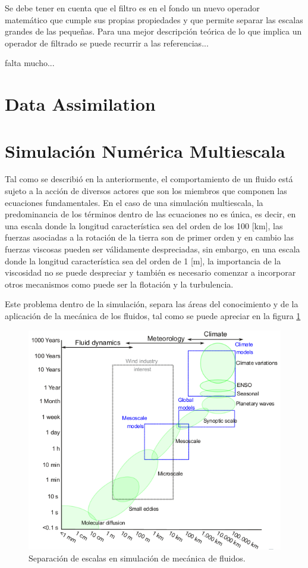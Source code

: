 Se debe tener en cuenta que el filtro es en el fondo un nuevo operador matemático que cumple sus propias propiedades y que permite separar las escalas grandes de las pequeñas. Para una mejor descripción teórica de lo que implica un operador de filtrado se puede recurrir a las referencias...

falta mucho...

\section{Data Assimilation}

\section{Simulación Numérica Multiescala}
Tal como se describió en la anteriormente, el comportamiento de un fluido está sujeto a la acción de diversos actores que son los miembros que componen las ecuaciones fundamentales. En el caso de una simulación multiescala, la predominancia de los términos dentro de las ecuaciones no es única, es decir, en una escala donde la longitud característica sea del orden de los 100 [km], las fuerzas asociadas a la rotación de la tierra son de primer orden y en cambio las fuerzas viscosas pueden ser válidamente despreciadas, sin embargo, en una escala donde la longitud característica sea del orden de 1 [m], la importancia de la viscosidad no se puede despreciar y también es necesario comenzar a incorporar otros mecanismos como puede ser la flotación y la turbulencia.

Este problema dentro de la simulación, separa las áreas del conocimiento y de la aplicación de la mecánica de los fluidos, tal como se puede apreciar en la figura \ref{fig:escalas}

\begin{figure}[H]
\centering
\includegraphics[width=0.7\linewidth]{Imagenes/terraincog}
\caption{Separación de escalas en simulación de mecánica de fluidos.}
\label{fig:escalas}
\end{figure}

